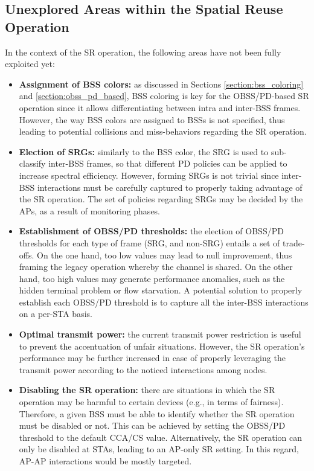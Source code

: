 \documentclass{ieeeaccess}
\begin{document}
\subsection{Unexplored Areas within the Spatial Reuse Operation}
In the context of the SR operation, the following areas have not been fully exploited yet:
\begin{itemize}
	\item \textbf{Assignment of BSS colors:} as discussed in Sections \ref{section:bss_coloring} and \ref{section:obss_pd_based}, BSS coloring is key for the OBSS/PD-based SR operation since it allows differentiating between intra and inter-BSS frames. However, the way BSS colors are assigned to BSSs is not specified, thus leading to potential collisions and miss-behaviors regarding the SR operation.
	\item \textbf{Election of SRGs:} similarly to the BSS color, the SRG is used to sub-classify inter-BSS frames, so that different PD policies can be applied to increase spectral efficiency. However, forming SRGs is not trivial since inter-BSS interactions must be carefully captured to properly taking advantage of the SR operation. The set of policies regarding SRGs may be decided by the APs, as a result of monitoring phases.%
	\item \textbf{Establishment of OBSS/PD thresholds:} the election of OBSS/PD thresholds for each type of frame (SRG, and non-SRG) entails a set of trade-offs. On the one hand, too low values may lead to null improvement, thus framing the legacy operation whereby the channel is shared. On the other hand, too high values may generate performance anomalies, such as the hidden terminal problem or flow starvation. A potential solution to properly establish each OBSS/PD threshold is to capture all the inter-BSS interactions on a per-STA basis.
	\item \textbf{Optimal transmit power:} the current transmit power restriction is useful to prevent the accentuation of unfair situations. However, the SR operation's performance may be further increased in case of properly leveraging the transmit power according to the noticed interactions among nodes.
	\item \textbf{Disabling the SR operation:} there are situations in which the SR operation may be harmful to certain devices (e.g., in terms of fairness). Therefore, a given BSS must be able to identify whether the SR operation must be disabled or not. This can be achieved by setting the OBSS/PD threshold to the default CCA/CS value. Alternatively, the SR operation can only be disabled at STAs, leading to an AP-only SR setting. In this regard, AP-AP interactions would be mostly targeted.
\end{itemize}
\end{document}
